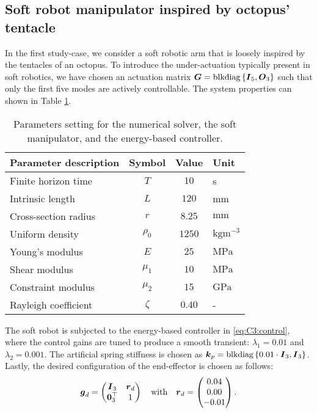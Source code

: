 \subsection{Soft robot manipulator inspired by octopus' tentacle}
In the first study-case, we consider a soft robotic arm that is loosely inspired by the tentacles of an octopus. To introduce the under-actuation typically present in soft robotics, we have chosen an actuation matrix $\boldsymbol{G} = \textnormal{blkdiag}\left\{ {\boldsymbol{I}_5, \boldsymbol{O}_3} \right\}$ such that only the first five modes are actively controllable. The system  properties can shown in Table \ref{tab:C3:parameters1}.
%
\begin{table}[t]
  \vspace{-0.25cm}
  \caption{Parameters setting for the numerical solver, the soft manipulator, and the energy-based controller.}\label{tab:C3:parameters1} \centering
  \begin{tabular}{l|c|c|l}
    Parameter description & Symbol & Value & Unit \\
    \midrule
    Finite horizon time & $T $ & $10$ & s \\
    Intrinsic length & $L $ & $ 120$ & mm \\
    Cross-section radius & $r $ & $ 8.25$ & $\text{mm}$ \\
    Uniform density & $\rho_0 $ & $ 1250$ & $\text{kg}\text{m}^{-3}$ \\
    Young's modulus & $E $ & $ 25$ & $\text{MPa}$ \\
    Shear modulus & $\mu_1 $ & $ 10 $ & $\text{MPa}$ \\
    Constraint modulus & $\mu_2 $ & $ 15 $ & $\text{GPa}$ \\
    Rayleigh coefficient & $\zeta $ & $ 0.40 $ & - \\
    \bottomrule
  \end{tabular}
  \vspace{-3mm}
  \end{table}
%
The soft robot is subjected to the energy-based controller in \eqref{eq:C3:control}, where the control gains are tuned to produce a smooth transient: $\lambda_1 = 0.01$ and $\lambda_2 = 0.001$. The artificial spring stiffness is chosen as $\boldsymbol{k}_p = \textnormal{blkdiag}\left\{ {0.01\cdot \boldsymbol{I}_3, \boldsymbol{I}_3} \right\}$. Lastly, the desired configuration of the end-effector is chosen as follows:
%
\begin{equation*}
\boldsymbol{g}_d = \begin{pmatrix} \boldsymbol{I}_3 & \boldsymbol{r}_d \\ \boldsymbol{0}_3^\top & 1 \end{pmatrix} \quad \text{with} \quad \boldsymbol{r}_d = \begin{pmatrix}  0.04 \\ 0.00 \\ -0.01  \end{pmatrix}.
\end{equation*}
